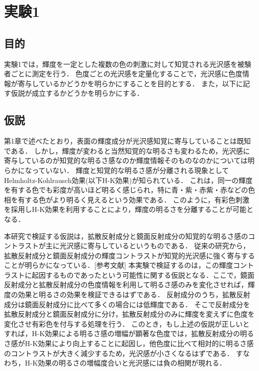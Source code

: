 \chapter{実験1}

\section{目的}

    実験1では，輝度を一定とした複数の色の刺激に対して知覚される光沢感を被験者ごとに測定を行う．
    色度ごとの光沢感を定量化することで，光沢感に色度情報が寄与しているかどうかを明らかにすることを目的とする．
    また，以下に記す仮説が成立するかどうかを明らかにする．

\section{仮説}

    第1章で述べたとおり，表面の輝度成分が光沢感知覚に寄与していることは既知である．
    しかし，輝度が変わると当然知覚的な明るさも変わるため，光沢感に寄与しているのが知覚的な明るさ感なのか輝度情報そのものなのかについては明らかになっていない．
    輝度と知覚的な明るさ感が分離される現象としてHelmholtz-Kohlrausch効果(以下H-K効果)が知られている．
    これは，同一の輝度を有する色でも彩度が高いほど明るく感じられ，特に青・紫・赤紫・赤などの色相を有する色がより明るく見えるという効果である．
    このように，有彩色刺激を採用しH-K効果を利用することにより，輝度の明るさを分離することが可能となる．

    本研究で検証する仮説は，拡散反射成分と鏡面反射成分の知覚的な明るさ感のコントラストが主に光沢感に寄与しているというものである．
    従来の研究から，拡散反射成分と鏡面反射成分の輝度コントラストが知覚的光沢感に強く寄与することが明らかになっている．[参考文献]
    本実験で検証するのは，この輝度コントラストに起因するものであったという可能性に関する仮説となる．ここで，鏡面反射成分と拡散反射成分の色度情報を利用して明るさ感のみを変化させれば，輝度の効果と明るさの効果を検証できるはずである．
    反射成分のうち，拡散反射成分は鏡面反射成分に比べて多くの場合には低輝度である．
    そこで反射成分を拡散反射成分と鏡面反射成分に分け，拡散反射成分のみに輝度を変えずに色度を変化させ有彩色を付与する処理を行う．
    このとき，もし上述の仮説が正しいとすれば，H-K効果による明るさ感の増幅が顕著な色度では，拡散反射成分の明るさ感がH-K効果により向上することに起因し，他色度に比べて相対的に明るさ感のコントラストが大きく減少するため，光沢感が小さくなるはずである．
    すなわち，H-K効果の明るさの増幅度合いと光沢感には負の相関が現れる．

